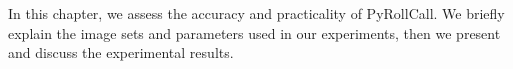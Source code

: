 In this chapter, we assess the accuracy and practicality of PyRollCall. We briefly explain
the image sets and parameters used in our experiments, then we present and discuss
the experimental results.




